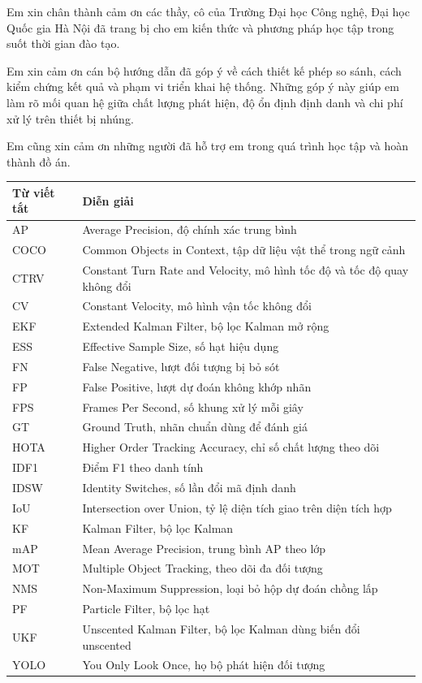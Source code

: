 \clearpage{}
Em xin chân thành cảm ơn các thầy, cô của Trường Đại học Công nghệ, Đại học Quốc gia Hà Nội đã trang bị cho em kiến thức và phương pháp học tập trong suốt thời gian đào tạo.

Em xin cảm ơn cán bộ hướng dẫn đã góp ý về cách thiết kế phép so sánh, cách kiểm chứng kết quả và phạm vi triển khai hệ thống. Những góp ý này giúp em làm rõ mối quan hệ giữa chất lượng phát hiện, độ ổn định định danh và chi phí xử lý trên thiết bị nhúng.

Em cũng xin cảm ơn những người đã hỗ trợ em trong quá trình học tập và hoàn thành đồ án.
\begin{flushright}\textbf{\SinhVien}\end{flushright}

\clearpage{}\pagestyle{plain}\tableofcontents
\clearpage\listoffigures
\clearpage\listoftables
\clearpage{}
\noindent\begin{tabularx}{\textwidth}{@{}lX@{}}
\toprule\textbf{Từ viết tắt} & \textbf{Diễn giải}\\\midrule
AP & Average Precision, độ chính xác trung bình\\
COCO & Common Objects in Context, tập dữ liệu vật thể trong ngữ cảnh\\
CTRV & Constant Turn Rate and Velocity, mô hình tốc độ và tốc độ quay không đổi\\
CV & Constant Velocity, mô hình vận tốc không đổi\\
EKF & Extended Kalman Filter, bộ lọc Kalman mở rộng\\
ESS & Effective Sample Size, số hạt hiệu dụng\\
FN & False Negative, lượt đối tượng bị bỏ sót\\
FP & False Positive, lượt dự đoán không khớp nhãn\\
FPS & Frames Per Second, số khung xử lý mỗi giây\\
GT & Ground Truth, nhãn chuẩn dùng để đánh giá\\
HOTA & Higher Order Tracking Accuracy, chỉ số chất lượng theo dõi\\
IDF1 & Điểm F1 theo danh tính\\
IDSW & Identity Switches, số lần đổi mã định danh\\
IoU & Intersection over Union, tỷ lệ diện tích giao trên diện tích hợp\\
KF & Kalman Filter, bộ lọc Kalman\\
mAP & Mean Average Precision, trung bình AP theo lớp\\
MOT & Multiple Object Tracking, theo dõi đa đối tượng\\
NMS & Non-Maximum Suppression, loại bỏ hộp dự đoán chồng lấp\\
PF & Particle Filter, bộ lọc hạt\\
UKF & Unscented Kalman Filter, bộ lọc Kalman dùng biến đổi unscented\\
YOLO & You Only Look Once, họ bộ phát hiện đối tượng\\\bottomrule
\end{tabularx}
